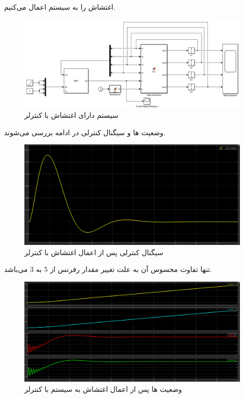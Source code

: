 \documentclass[14pt, a4paper]{extarticle}
\begin{document}
اغتشاش را به سیستم اعمال می‌کنیم.
 \begin{figure}[h!]
	\centering
	\includegraphics[scale = 0.55]{Q2_3_sim.png}
	\caption{سیستم دارای اغتشاش با کنترلر 
		}
\end{figure}

وضعیت 
ها و سیگنال کنترلی در ادامه بررسی می‌شوند.

\begin{figure}[h!]
	\centering
	\includegraphics[scale = 0.4]{Q2_3_1_control.png}
	\caption{سیگنال کنترلی پس از اعمال اغتشاش با کنترلر 
	}
\end{figure}

تنها تفاوت محسوس آن به علت تغییر مقدار رفرنس از 5 به 3 می‌باشد.

\newpage
\begin{figure}[h!]
	\centering
	\includegraphics[scale = 0.4]{Q2_3_1_states1.png}
	\caption{وضعیت 
		ها پس از اعمال اغتشاش به سیستم با کنترلر 
	}
\end{figure}
\end{document}
